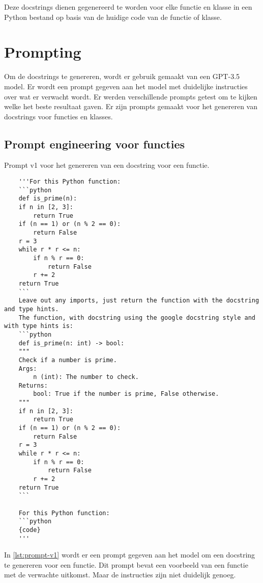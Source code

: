 Deze docstrings dienen gegenereerd te worden voor elke functie en klasse in een Python bestand op basis van de huidige code van de functie of klasse.

\section{Prompting}
\label{sec:bestanddocumentatie-prompting}

Om de docstrings te genereren, wordt er gebruik gemaakt van een GPT-3.5 model.
Er wordt een prompt gegeven aan het model met duidelijke instructies over wat er verwacht wordt.
Er werden verschillende prompts getest om te kijken welke het beste resultaat gaven.
Er zijn prompts gemaakt voor het genereren van docstrings voor functies en klasses. 


\subsection{Prompt engineering voor functies}

\begin{listing}
    \caption{Prompt v1 voor het genereren van een docstring voor een functie.}
    \label{lst:prompt-v1}
    \begin{verbatim}
    '''For this Python function:
    ```python	
    def is_prime(n):
    if n in [2, 3]:
        return True
    if (n == 1) or (n % 2 == 0):
        return False
    r = 3
    while r * r <= n:
        if n % r == 0:
            return False
        r += 2
    return True
    ```
    Leave out any imports, just return the function with the docstring and type hints.
    The function, with docstring using the google docstring style and with type hints is:
    ```python	
    def is_prime(n: int) -> bool:
    """
    Check if a number is prime.
    Args:
        n (int): The number to check.
    Returns:
        bool: True if the number is prime, False otherwise.
    """
    if n in [2, 3]:
        return True
    if (n == 1) or (n % 2 == 0):
        return False
    r = 3
    while r * r <= n:
        if n % r == 0:
            return False
        r += 2
    return True
    ```
    
    For this Python function:
    ```python	
    {code}
    '''
    \end{verbatim}
\end{listing}

In \ref{lst:prompt-v1} wordt er een prompt gegeven aan het model om een docstring te genereren voor een functie. 
Dit prompt bevat een voorbeeld van een functie met de verwachte uitkomst. 
Maar de instructies zijn niet duidelijk genoeg. 


